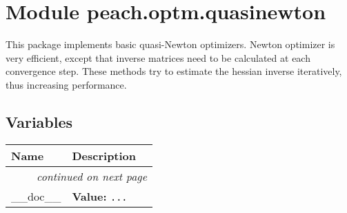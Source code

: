 %
%
%


\section{Module peach.optm.quasinewton}

    \label{peach:optm:quasinewton}

This package implements basic quasi-Newton optimizers. Newton optimizer is very
efficient, except that inverse matrices need to be calculated at each
convergence step. These methods try to estimate the hessian inverse iteratively,
thus increasing performance.


  \subsection{Variables}

\begin{longtable}{|p{}|p{}|l}
\cline{1-2}
\cline{1-2} \centering \textbf{Name} & \centering \textbf{Description}& \\
\cline{1-2}
\endhead\cline{1-2}\multicolumn{3}{r}{\small\textit{continued on next page}}\\\endfoot\cline{1-2}
\endlastfoot\raggedright \_\-\_\-d\-o\-c\-\_\-\_\- & \raggedright \textbf{Value:} 
{\tt \texttt{...}}&\\
\cline{1-2}
\end{longtable}



